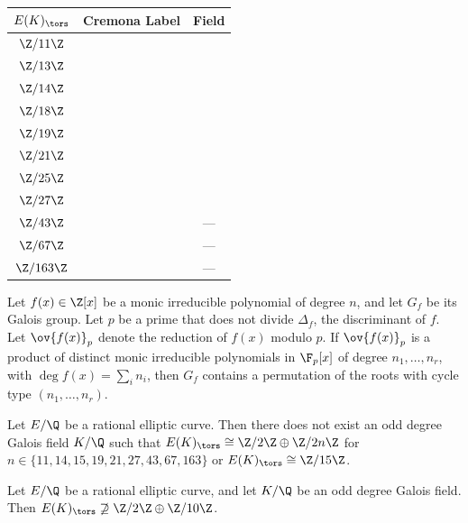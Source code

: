 \begin{frame}[plain,c]
	\begin{table}[!ht]
	\centering
	\begin{tabular}{ccc} \hline
	$E(K)_\tors$ & Cremona Label & Field \\ \hline
	$\Z/11\Z$ & \otoco{} & \qzetaeep{} \\
	$\Z/13\Z$ & \ofsbo{} & \qzetasp{} \\
	$\Z/14\Z$ & \fnaf{} & \qzetasp{} \\ 
	$\Z/18\Z$ & \ffasix{} & \qzetasp{} \\
	$\Z/19\Z$ & \tsoao{} & \qzetantp{} \\
	$\Z/21\Z$ & \ostbo{} & \qzetanp{} \\ 
	$\Z/25\Z$ & \eeat{} & \qzetaeep{} \\
	$\Z/27\Z$ & \tsaf{} & \qzetatsp{} \\
	$\Z/43\Z$ & \oefnao{} & --- \\
	$\Z/67\Z$ & \ffenao{} & --- \\
	$\Z/163\Z$ & \tsfsnao{} & ---
	\end{tabular}
	\end{table}
\end{frame}



\begin{frame}[plain,c]

\scriptsize
\begin{thm}[Dedekind]
Let $f(x) \in \Z[x]$ be a monic irreducible polynomial of degree $n$, and let $G_f$ be its Galois group. Let $p$ be a prime that does not divide $\Delta_f$, the discriminant of $f$. Let $\ov{f(x)}_p$ denote the reduction of $f(x)$ modulo $p$. If $\ov{f(x)}_p$ is a product of distinct monic irreducible polynomials in $\F_p[x]$ of degree $n_1, \ldots, n_r$, with $\deg f(x)= \sum_i n_i$, then $G_f$ contains a permutation of the roots with cycle type $(n_1, \ldots, n_r)$. 
\end{thm}

\begin{lem}[M.]
Let $E/\Q$ be a rational elliptic curve. Then there does not exist an odd degree Galois field $K/\Q$ such that $E(K)_\tors \cong \Z/2\Z \oplus \Z/2n\Z$ for $n \in \{ 11, 14, 15, 19, 21, 27, 43, 67, 163 \}$ or $E(K)_\tors \cong \Z/15\Z$. 
\end{lem} 

\begin{lem} [M.]
Let $E/\Q$ be a rational elliptic curve, and let $K/\Q$ be an odd degree Galois field. Then $E(K)_\tors \not\supseteq \Z/2\Z \oplus \Z/10\Z$.
\end{lem} 

\end{frame}




